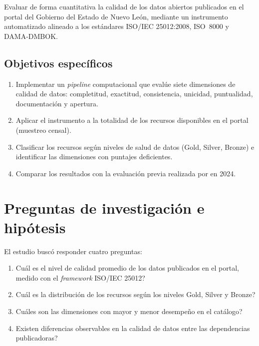 \documentclass[12pt,letterpaper]{article}
\begin{document}
Evaluar de forma cuantitativa la calidad de los datos abiertos publicados en el
portal del Gobierno del Estado de Nuevo Le\'on, mediante un instrumento
automatizado alineado a los est\'andares ISO/IEC 25012:2008, ISO~8000 y DAMA-DMBOK.

\subsection{Objetivos espec\'ificos}

\begin{enumerate}
  \item Implementar un \textit{pipeline} computacional que eval\'ue siete
    dimensiones de calidad de datos: completitud, exactitud, consistencia,
    unicidad, puntualidad, documentaci\'on y apertura.
  \item Aplicar el instrumento a la totalidad de los recursos disponibles en
    el portal (muestreo censal).
  \item Clasificar los recursos seg\'un niveles de salud de datos (Gold,
    Silver, Bronze) e identificar las dimensiones con puntajes deficientes.
  \item Comparar los resultados con la evaluaci\'on previa realizada por
    \textcite{alanis2024} en 2024.
\end{enumerate}

\section{Preguntas de investigaci\'on e hip\'otesis}

El estudio busc\'o responder cuatro preguntas:

\begin{enumerate}
  \item \textquestiondown Cu\'al es el nivel de calidad promedio de los datos
    publicados en el portal, medido con el \textit{framework} ISO/IEC 25012?
  \item \textquestiondown Cu\'al es la distribuci\'on de los recursos seg\'un
    los niveles Gold, Silver y Bronze?
  \item \textquestiondown Cu\'ales son las dimensiones con mayor y menor
    desempe\~no en el cat\'alogo?
  \item \textquestiondown Existen diferencias observables en la calidad de
    datos entre las dependencias publicadoras?
\end{enumerate}
\end{document}
